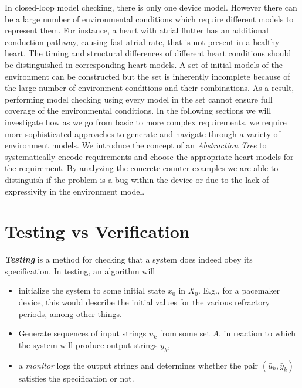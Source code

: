 In closed-loop model checking, there is only one device model. 
However there can be a large number of environmental conditions which require different models to represent them. For instance, a heart with atrial flutter has an additional conduction pathway, causing fast atrial rate, that is not present in a healthy heart. The timing and structural differences of different heart conditions should be distinguished in corresponding heart models.
A set of initial models of the environment can be constructed but the set is inherently incomplete because of the large number of environment conditions and their combinations. 
As a result, performing model checking using every model in the set cannot ensure full coverage of the environmental conditions. In the following sections we will investigate how as we go from basic to more complex requirements, we require more sophisticated approaches to generate and navigate through a variety of environment models. We introduce the concept of an \emph{Abstraction Tree} to systematically encode requirements and choose the appropriate heart models for the requirement. By analyzing the concrete counter-examples we are able to distinguish if the problem is a bug within the device or due to the lack of expressivity in the environment model. 

\section{Testing vs Verification}

\newcommand{\ub}{\bar{u}}
\newcommand{\yb}{\bar{y}}

\emph{\textbf{Testing}} is a method for checking that a system does indeed obey its specification. 
In testing, an algorithm will 
\begin{itemize}
	\item initialize the system to some initial state $x_0$ in $X_0$.
	E.g., for a pacemaker device, this would describe the initial values for the various refractory periods, among other things.
	\item Generate sequences of input strings $\bar{u}_k$ from some set $A$, in reaction to which the system will produce output strings $\bar{y}_k$,
	\item a \emph{monitor} logs the output strings and determines whether the pair $(\bar{u}_k,\bar{y}_k)$ satisfies the specification or not.	
\end{itemize}

